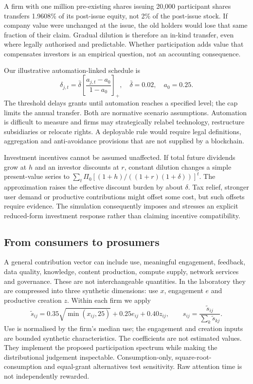 A firm with one million pre-existing shares issuing 20,000 participant shares transfers 1.9608\% of its post-issue equity, not 2\% of the post-issue stock. If company value were unchanged at the issue, the old holders would lose that same fraction of their claim. Gradual dilution is therefore an in-kind transfer, even where legally authorised and predictable. Whether participation adds value that compensates investors is an empirical question, not an accounting consequence.

Our illustrative automation-linked schedule is
\begin{equation}
\delta_{j,t}=\bar\delta\left[\frac{a_{j,t}-a_0}{1-a_0}\right]_+,\quad
\bar\delta=0.02,\quad a_0=0.25.\label{eq:delta}
\end{equation}
The threshold delays grants until automation reaches a specified level; the cap limits the annual transfer. Both are normative scenario assumptions. Automation is difficult to measure and firms may strategically relabel technology, restructure subsidiaries or relocate rights. A deployable rule would require legal definitions, aggregation and anti-avoidance provisions that are not supplied by a blockchain.

Investment incentives cannot be assumed unaffected. If total future dividends grow at $h$ and an investor discounts at $r$, constant dilution changes a simple present-value series to $\sum_t\Pi_0[(1+h)/((1+r)(1+\delta))]^t$. The approximation raises the effective discount burden by about $\delta$. Tax relief, stronger user demand or productive contributions might offset some cost, but such offsets require evidence. The simulation consequently imposes and stresses an explicit reduced-form investment response rather than claiming incentive compatibility.

\subsection{From consumers to prosumers}
A general contribution vector can include use, meaningful engagement, feedback, data quality, knowledge, content production, compute supply, network services and governance. These are not interchangeable quantities. In the laboratory they are compressed into three synthetic dimensions: use $x$, engagement $e$ and productive creation $z$. Within each firm we apply
\begin{equation}
\widetilde s_{ij}=0.35\sqrt{\min(x_{ij},25)}+0.25e_{ij}+0.40z_{ij},\qquad
s_{ij}=\frac{\widetilde s_{ij}}{\sum_k\widetilde s_{kj}}.\label{eq:score}
\end{equation}
Use is normalised by the firm's median use; the engagement and creation inputs are bounded synthetic characteristics. The coefficients are not estimated values. They implement the proposed participation spectrum while making the distributional judgement inspectable. Consumption-only, square-root-consumption and equal-grant alternatives test sensitivity. Raw attention time is not independently rewarded.

